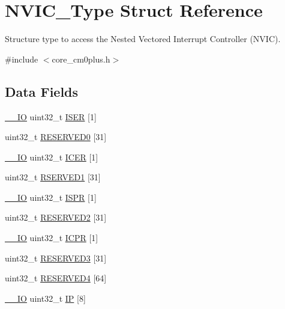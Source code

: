 \hypertarget{struct_n_v_i_c___type}{}\section{N\+V\+I\+C\+\_\+\+Type Struct Reference}
\label{struct_n_v_i_c___type}


Structure type to access the Nested Vectored Interrupt Controller (N\+V\+IC).  




{\ttfamily \#include $<$core\+\_\+cm0plus.\+h$>$}

\subsection*{Data Fields}
\begin{DoxyCompactItemize}
\item 
\mbox{\hyperlink{core__cm0plus_8h_aec43007d9998a0a0e01faede4133d6be}{\+\_\+\+\_\+\+IO}} uint32\+\_\+t \mbox{\hyperlink{struct_n_v_i_c___type_ab0e414637f38c9234818752145f0d1e6}{I\+S\+ER}} \mbox{[}1\mbox{]}
\item 
uint32\+\_\+t \mbox{\hyperlink{struct_n_v_i_c___type_a03c9ef255da9ec52ad195ff310267707}{R\+E\+S\+E\+R\+V\+E\+D0}} \mbox{[}31\mbox{]}
\item 
\mbox{\hyperlink{core__cm0plus_8h_aec43007d9998a0a0e01faede4133d6be}{\+\_\+\+\_\+\+IO}} uint32\+\_\+t \mbox{\hyperlink{struct_n_v_i_c___type_a36b661a339cab43484a412776b3840d7}{I\+C\+ER}} \mbox{[}1\mbox{]}
\item 
uint32\+\_\+t \mbox{\hyperlink{struct_n_v_i_c___type_ab8c47832d71ed57b001dbcc5741972e4}{R\+S\+E\+R\+V\+E\+D1}} \mbox{[}31\mbox{]}
\item 
\mbox{\hyperlink{core__cm0plus_8h_aec43007d9998a0a0e01faede4133d6be}{\+\_\+\+\_\+\+IO}} uint32\+\_\+t \mbox{\hyperlink{struct_n_v_i_c___type_a0ed5d4d6b2105c9235639256bf6f94b8}{I\+S\+PR}} \mbox{[}1\mbox{]}
\item 
uint32\+\_\+t \mbox{\hyperlink{struct_n_v_i_c___type_aaade1cfbe11f972bd8172705a64e761e}{R\+E\+S\+E\+R\+V\+E\+D2}} \mbox{[}31\mbox{]}
\item 
\mbox{\hyperlink{core__cm0plus_8h_aec43007d9998a0a0e01faede4133d6be}{\+\_\+\+\_\+\+IO}} uint32\+\_\+t \mbox{\hyperlink{struct_n_v_i_c___type_a193e3ea34c0cb880ced9f31c80320758}{I\+C\+PR}} \mbox{[}1\mbox{]}
\item 
uint32\+\_\+t \mbox{\hyperlink{struct_n_v_i_c___type_a9b8fd6d6abdb53c9c474cd1857906546}{R\+E\+S\+E\+R\+V\+E\+D3}} \mbox{[}31\mbox{]}
\item 
uint32\+\_\+t \mbox{\hyperlink{struct_n_v_i_c___type_af900a5feb8eaad3787ff37801da4f949}{R\+E\+S\+E\+R\+V\+E\+D4}} \mbox{[}64\mbox{]}
\item 
\mbox{\hyperlink{core__cm0plus_8h_aec43007d9998a0a0e01faede4133d6be}{\+\_\+\+\_\+\+IO}} uint32\+\_\+t \mbox{\hyperlink{struct_n_v_i_c___type_aa09d96b0a7347a2df161495145a51a93}{IP}} \mbox{[}8\mbox{]}
\end{DoxyCompactItemize}


